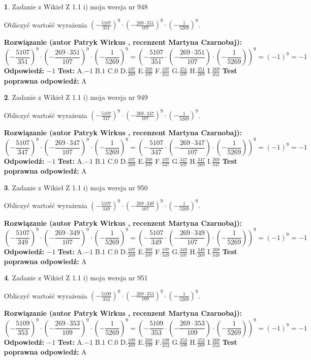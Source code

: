 \documentclass[12pt, a4paper]{article}
\theoremstyle{definition} %
\newtheorem{zad}{}
\newcommand{\zadStart}[1]{\begin{zad}#1\newline}
\newcommand{\zadStop}{\end{zad}}
\newcommand{\rozwStart}[2]{\noindent \textbf{Rozwiązanie (autor #1 , recenzent #2): }\newline}
\newcommand{\rozwStop}{\newline}
\newcommand{\odpStart}{\noindent \textbf{Odpowiedź:}\newline}
\newcommand{\odpStop}{\newline}
\newcommand{\testStart}{\noindent \textbf{Test:}\newline}
\newcommand{\testStop}{\newline}
\newcommand{\kluczStart}{\noindent \textbf{Test poprawna odpowiedź:}\newline}
\newcommand{\kluczStop}{\newline}
\begin{document}
\zadStart{Zadanie z Wikieł Z 1.1 i) moja wersja nr 948}

Obliczyć wartość wyrażenia $(-\frac{5107}{351})^{9} \cdot (-\frac{269 \cdot 351}{107})^{9} \cdot (-\frac{1}{5269})^{9}$.
\zadStop
\rozwStart{Patryk Wirkus}{Martyna Czarnobaj}
$$(-\frac{5107}{351})^{9} \cdot (-\frac{269 \cdot 351}{107})^{9} \cdot (-\frac{1}{5269})^{9} = (-\frac{5107}{351} \cdot (-\frac{269 \cdot 351}{107}) \cdot (-\frac{1}{5269}))^{9} = (-1)^{9} = -1$$
\rozwStop
\odpStart
$-1$
\odpStop
\testStart
A.$-1$ B.$1$ C.$0$ D.$\frac{107}{269}$ E.$\frac{269}{107}$
F.$\frac{107}{351}$ G.$\frac{351}{107}$
H.$\frac{351}{269}$
I.$\frac{269}{351}$
\testStop
\kluczStart
A
\kluczStop



\zadStart{Zadanie z Wikieł Z 1.1 i) moja wersja nr 949}

Obliczyć wartość wyrażenia $(-\frac{5107}{347})^{9} \cdot (-\frac{269 \cdot 347}{107})^{9} \cdot (-\frac{1}{5269})^{9}$.
\zadStop
\rozwStart{Patryk Wirkus}{Martyna Czarnobaj}
$$(-\frac{5107}{347})^{9} \cdot (-\frac{269 \cdot 347}{107})^{9} \cdot (-\frac{1}{5269})^{9} = (-\frac{5107}{347} \cdot (-\frac{269 \cdot 347}{107}) \cdot (-\frac{1}{5269}))^{9} = (-1)^{9} = -1$$
\rozwStop
\odpStart
$-1$
\odpStop
\testStart
A.$-1$ B.$1$ C.$0$ D.$\frac{107}{269}$ E.$\frac{269}{107}$
F.$\frac{107}{347}$ G.$\frac{347}{107}$
H.$\frac{347}{269}$
I.$\frac{269}{347}$
\testStop
\kluczStart
A
\kluczStop



\zadStart{Zadanie z Wikieł Z 1.1 i) moja wersja nr 950}

Obliczyć wartość wyrażenia $(-\frac{5107}{349})^{9} \cdot (-\frac{269 \cdot 349}{107})^{9} \cdot (-\frac{1}{5269})^{9}$.
\zadStop
\rozwStart{Patryk Wirkus}{Martyna Czarnobaj}
$$(-\frac{5107}{349})^{9} \cdot (-\frac{269 \cdot 349}{107})^{9} \cdot (-\frac{1}{5269})^{9} = (-\frac{5107}{349} \cdot (-\frac{269 \cdot 349}{107}) \cdot (-\frac{1}{5269}))^{9} = (-1)^{9} = -1$$
\rozwStop
\odpStart
$-1$
\odpStop
\testStart
A.$-1$ B.$1$ C.$0$ D.$\frac{107}{269}$ E.$\frac{269}{107}$
F.$\frac{107}{349}$ G.$\frac{349}{107}$
H.$\frac{349}{269}$
I.$\frac{269}{349}$
\testStop
\kluczStart
A
\kluczStop



\zadStart{Zadanie z Wikieł Z 1.1 i) moja wersja nr 951}

Obliczyć wartość wyrażenia $(-\frac{5109}{353})^{9} \cdot (-\frac{269 \cdot 353}{109})^{9} \cdot (-\frac{1}{5269})^{9}$.
\zadStop
\rozwStart{Patryk Wirkus}{Martyna Czarnobaj}
$$(-\frac{5109}{353})^{9} \cdot (-\frac{269 \cdot 353}{109})^{9} \cdot (-\frac{1}{5269})^{9} = (-\frac{5109}{353} \cdot (-\frac{269 \cdot 353}{109}) \cdot (-\frac{1}{5269}))^{9} = (-1)^{9} = -1$$
\rozwStop
\odpStart
$-1$
\odpStop
\testStart
A.$-1$ B.$1$ C.$0$ D.$\frac{109}{269}$ E.$\frac{269}{109}$
F.$\frac{109}{353}$ G.$\frac{353}{109}$
H.$\frac{353}{269}$
I.$\frac{269}{353}$
\testStop
\kluczStart
A
\kluczStop
\end{document}
